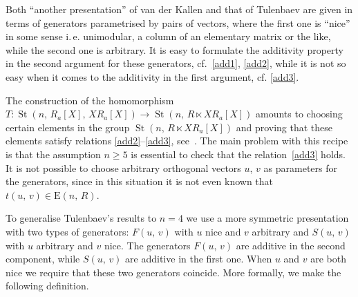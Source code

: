 \documentclass[11pt]{amsart}
\theoremstyle{plain} \declaretheorem[name=Theorem, Refname={Theorem,Theorems}]{tm} \Crefname{tm}{Theorem}{Theorems}
\numberwithin{equation}{section}
\theoremstyle{definition} \newtheorem{df}[lm]{Definition} \Crefname{df}{Definition}{Definitions}
\theoremstyle{remark} \newtheorem{rk}[lm]{Remark} \Crefname{rk}{Remark}{Remarks}
\newcommand{\E}{{\mathrm{E}}}
\newcommand{\St}{\mathop{\mathrm{St}}\nolimits}
\begin{document}
Both ``another presentation'' of van der Kallen and that of Tulenbaev are given in terms of generators parametrised by pairs of vectors,
 where the first one is ``nice'' in some sense i.\,e. unimodular, a column of an elementary matrix or the like, while the second one is arbitrary.
It is easy to formulate the additivity property in the second argument for these generators, cf.~\eqref{add1}, \eqref{add2},
while it is not so easy when it comes to the additivity in the first argument, cf. \eqref{add3}.

The construction of the homomorphism $T\colon\St(n,\,R_a[X],\,XR_a[X])\rightarrow\St(n,\,R\ltimes XR_a[X])$
amounts to choosing certain elements in the group $\St(n,\,R\ltimes XR_a[X])$ and proving that these elements satisfy relations \eqref{add2}--\eqref{add3}, see~\cite[Lemmas~1.2 and~1.3\,c)]{Tul}.
The main problem with this recipe is that the assumption $n\geq5$ is essential to check that the relation~\eqref{add3} holds.
It is not possible to choose arbitrary orthogonal vectors $u$, $v$ as parameters for the generators, since in this situation it is not even known that $t(u,\,v)\in\E(n,\,R)$.

To generalise Tulenbaev's results to $n=4$ we use a more symmetric presentation with two types of generators: 
$F(u,\,v)$ with $u$ nice and $v$ arbitrary and $S(u,\,v)$ with $u$ arbitrary and $v$ nice.
The generators $F(u,\,v)$ are additive in the second component, while $S(u,\,v)$ are additive in the first one.
When $u$ and $v$ are both nice we require that these two generators coincide.
More formally, we make the following definition.
\end{document}
